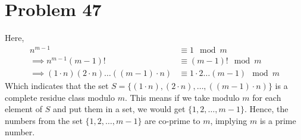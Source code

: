 \section*{Problem 47}
Here,
\begin{align*}
    n^{m-1}                                           & \equiv 1 \mod{m}                  \\
    \implies n^{m-1} (m-1)!                           & \equiv (m-1)! \mod{m}             \\
    \implies (1\cdot n)(2\cdot n)\ldots((m-1)\cdot n) & \equiv 1\cdot2\ldots(m-1) \mod{m}
\end{align*}
Which indicates that the set $S=\{(1\cdot n), (2\cdot n), \ldots, ((m-1)\cdot n)\}$ is a complete residue class modulo $m$. This means if we take modulo $m$ for each element of $S$ and put them in a set, we would get $\{1,2,\ldots,m-1\}$. Hence, the numbers from the set $\{1,2,\ldots,m-1\}$ are co-prime to $m$, implying $m$ is a prime number.
